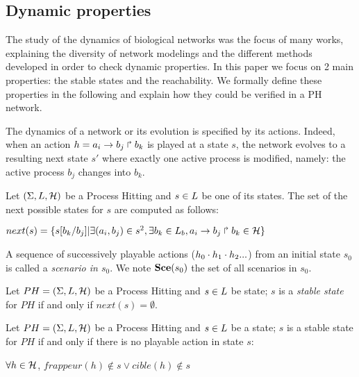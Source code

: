 \subsection*{Dynamic properties}

The study of the dynamics of biological networks was the focus of many works, explaining the diversity of network modelings and the different methods developed in order to check dynamic properties.
In this paper we focus on 2 main properties: the stable states and the reachability.
We formally define these properties in the following and explain how they could be verified in a PH network.

The dynamics of a network or its evolution is specified by its actions.
Indeed, when an action $h = a_i\rightarrow b_j\Rsh b_k$ is played at a state $s$,
the network evolves to a resulting next state $s'$ where exactly one active process
is modified, namely: the active process $b_j$ changes into $b_k$.


\begin{definition}
\label{def:NextState}
Let $(\Sigma,L,\mathcal{H})$ be a Process Hitting and $s \in L$ be
one of its states. The set of the next possible states for $s$ are computed as follows:
\begin{center}
$next(s) = \{s[b_k /b_j ]| \exists (a_i , b_j ) \in s^2 , \exists b_k \in L_b , a_i\rightarrow b_j\Rsh b_k \in \mathcal{H}\}$
\end{center}
\end{definition}

A sequence of successively playable actions ($h_0 \cdot h_1 \cdot h_2...$)
from an initial state $s_0$ is called a \emph{scenario in $s_0$}.
We note $\mathbf{Sce}(s_0)$ the set of all scenarios in $s_0$.


\begin{definition}
\label{def:FixPoint1}
Let $PH = (\Sigma,L,\mathcal{H})$ be a Process Hitting and
$s \in L$ be state;
$s$ is a \emph{stable state} for $PH$ if and only if $next(s) = \emptyset $.
\end{definition}

\begin{definition}
\label{def:FixPoint2}
Let $PH = (\Sigma,L,\mathcal{H})$ be a Process Hitting and
$s \in L$ be a state;
$s$ is a stable state for $PH$ if and only if there is no playable action in state $s$: 
\begin{center}
$\forall h \in \mathcal{H}$, $frappeur(h) \notin s \vee cible(h) \notin s$
\end{center}
\end{definition}

